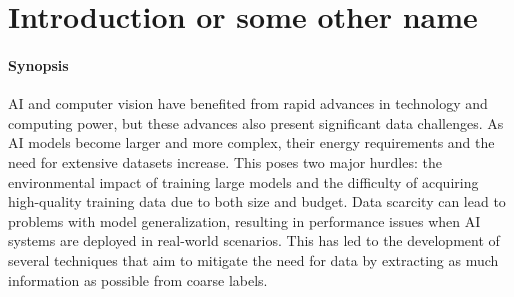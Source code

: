 \graphicspath{{ch1_introduction/}{Figures/}}

\chapter{Introduction or some other name}







\subsubsection{Synopsis}AI and computer vision have benefited from rapid advances in technology and computing power, but these advances also present significant data challenges. As AI models become larger and more complex, their energy requirements and the need for extensive datasets increase. This poses two major hurdles: the environmental impact of training large models and the difficulty of acquiring high-quality training data due to both size and budget. Data scarcity can lead to problems with model generalization, resulting in performance issues when AI systems are deployed in real-world scenarios. This has led to the development of several techniques that aim to mitigate the need for data by extracting as much information as possible from coarse labels.





